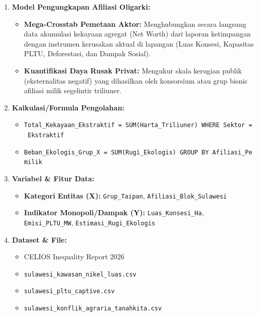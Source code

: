\documentclass[
]{article}
\providecommand{\tightlist}{%
  \setlength{\itemsep}{0pt}\setlength{\parskip}{0pt}}
\begin{document}
\begin{enumerate}
\def\labelenumi{\arabic{enumi}.}
\tightlist
\item
  \textbf{Model Pengungkapan Afiliasi Oligarki:}

  \begin{itemize}
  \tightlist
  \item
    \textbf{Mega-Crosstab Pemetaan Aktor:} Menghubungkan secara langsung
    data akumulasi kekayaan agregat (Net Worth) dari laporan ketimpangan
    dengan instrumen kerusakan aktual di lapangan (Luas Konsesi,
    Kapasitas PLTU, Deforestasi, dan Dampak Sosial).
  \item
    \textbf{Kuantifikasi Daya Rusak Privat:} Mengukur skala kerugian
    publik (eksternalitas negatif) yang dihasilkan oleh konsorsium atau
    grup bisnis afiliasi milik segelintir triliuner.
  \end{itemize}
\item
  \textbf{Kalkulasi/Formula Pengolahan:}

  \begin{itemize}
  \tightlist
  \item
    \texttt{Total\_Kekayaan\_Ekstraktif\ =\ SUM(Harta\_Triliuner)\ WHERE\ Sektor\ =\ \textquotesingle{}Ekstraktif\textquotesingle{}}
  \item
    \texttt{Beban\_Ekologis\_Grup\_X\ =\ SUM(Rugi\_Ekologis)\ GROUP\ BY\ Afiliasi\_Pemilik}
  \end{itemize}
\item
  \textbf{Variabel \& Fitur Data:}

  \begin{itemize}
  \tightlist
  \item
    \textbf{Kategori Entitas (X):} \texttt{Grup\_Taipan},
    \texttt{Afiliasi\_Blok\_Sulawesi}
  \item
    \textbf{Indikator Monopoli/Dampak (Y):} \texttt{Luas\_Konsesi\_Ha},
    \texttt{Emisi\_PLTU\_MW}, \texttt{Estimasi\_Rugi\_Ekologis}
  \end{itemize}
\item
  \textbf{Dataset \& File:}

  \begin{itemize}
  \tightlist
  \item
    CELIOS Inequality Report 2026
  \item
    \texttt{sulawesi\_kawasan\_nikel\_luas.csv}
  \item
    \texttt{sulawesi\_pltu\_captive.csv}
  \item
    \texttt{sulawesi\_konflik\_agraria\_tanahkita.csv}
  \end{itemize}
\end{enumerate}
\end{document}
